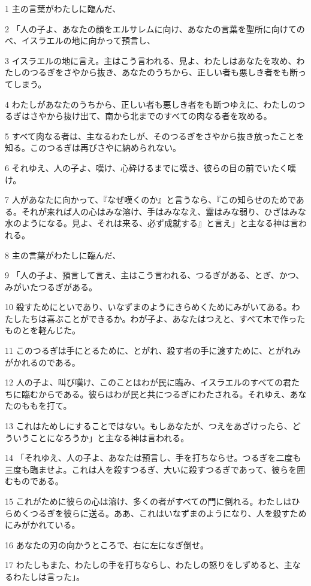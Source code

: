\par 1 主の言葉がわたしに臨んだ、
\par 2 「人の子よ、あなたの顔をエルサレムに向け、あなたの言葉を聖所に向けてのべ、イスラエルの地に向かって預言し、
\par 3 イスラエルの地に言え。主はこう言われる、見よ、わたしはあなたを攻め、わたしのつるぎをさやから抜き、あなたのうちから、正しい者も悪しき者をも断ってしまう。
\par 4 わたしがあなたのうちから、正しい者も悪しき者をも断つゆえに、わたしのつるぎはさやから抜け出て、南から北までのすべての肉なる者を攻める。
\par 5 すべて肉なる者は、主なるわたしが、そのつるぎをさやから抜き放ったことを知る。このつるぎは再びさやに納められない。
\par 6 それゆえ、人の子よ、嘆け、心砕けるまでに嘆き、彼らの目の前でいたく嘆け。
\par 7 人があなたに向かって、『なぜ嘆くのか』と言うなら、『この知らせのためである。それが来れば人の心はみな溶け、手はみななえ、霊はみな弱り、ひざはみな水のようになる。見よ、それは来る、必ず成就する』と言え」と主なる神は言われる。
\par 8 主の言葉がわたしに臨んだ、
\par 9 「人の子よ、預言して言え、主はこう言われる、つるぎがある、とぎ、かつ、みがいたつるぎがある。
\par 10 殺すためにといであり、いなずまのようにきらめくためにみがいてある。わたしたちは喜ぶことができるか。わが子よ、あなたはつえと、すべて木で作ったものとを軽んじた。
\par 11 このつるぎは手にとるために、とがれ、殺す者の手に渡すために、とがれみがかれるのである。
\par 12 人の子よ、叫び嘆け、このことはわが民に臨み、イスラエルのすべての君たちに臨むからである。彼らはわが民と共につるぎにわたされる。それゆえ、あなたのももを打て。
\par 13 これはためしにすることではない。もしあなたが、つえをあざけったら、どういうことになろうか」と主なる神は言われる。
\par 14 「それゆえ、人の子よ、あなたは預言し、手を打ちならせ。つるぎを二度も三度も臨ませよ。これは人を殺すつるぎ、大いに殺すつるぎであって、彼らを囲むものである。
\par 15 これがために彼らの心は溶け、多くの者がすべての門に倒れる。わたしはひらめくつるぎを彼らに送る。ああ、これはいなずまのようになり、人を殺すためにみがかれている。
\par 16 あなたの刃の向かうところで、右に左になぎ倒せ。
\par 17 わたしもまた、わたしの手を打ちならし、わたしの怒りをしずめると、主なるわたしは言った」。
